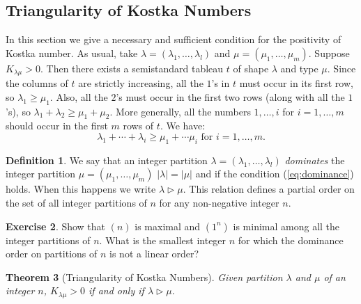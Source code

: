 \documentclass[11pt]{amsart}
\newtheorem{theorem}{Theorem}[subsection]
\theoremstyle{definition}
\newtheorem{definition}[theorem]{Definition}
\theoremstyle{example}
\newtheorem{exercise}[theorem]{Exercise}
\begin{document}
\subsection{Triangularity of Kostka Numbers}
\label{sec:triang-kostka-numb}
In this section we give a necessary and sufficient condition for the positivity of Kostka number.
As usual, take $\lambda=(\lambda_1,\dotsc,\lambda_l)$ and $\mu=(\mu_1,\dotsc,\mu_m)$.
Suppose $K_{\lambda\mu}>0$.
Then there exists a semistandard tableau $t$ of shape $\lambda$ and type $\mu$.
Since the columns of $t$ are strictly increasing, all the $1$'s in $t$ must occur in its first row, so $\lambda_1\geq \mu_1$.
Also, all the $2$'s must occur in the first two rows (along with all the $1$'s), so $\lambda_1+\lambda_2\geq \mu_1+\mu_2$.
More generally, all the numbers $1,\dotsc, i$ for $i=1,\dotsc,m$ should occur in the first $m$ rows of $t$.
We have:
\begin{equation}
  \label{eq:dominance}
  \lambda_1+\dotsb + \lambda_i \geq \mu_1+\dotsb \mu_i \text{ for } i=1,\dotsc, m.
\end{equation}
\begin{definition}
  We say that an integer partition $\lambda=(\lambda_1,\dotsc,\lambda_l)$ \emph{dominates} the integer partition $\mu=(\mu_1,\dotsc,\mu_m)$ $|\lambda|=|\mu|$ and if the condition (\ref{eq:dominance}) holds.
  When this happens we write $\lambda\rhd \mu$.
  This relation defines a partial order on the set of all integer partitions of $n$ for any non-negative integer $n$.
\end{definition}
\begin{exercise}
  Show that $(n)$ is maximal and $(1^n)$ is minimal among all the integer partitions of $n$.
  What is the smallest integer $n$ for which the dominance order on partitions of $n$ is not a linear order?
\end{exercise}
\begin{theorem}
  [Triangularity of Kostka Numbers]
  \label{theorem:Kostka-triangularity}
  Given partition $\lambda$ and $\mu$ of an integer $n$, $K_{\lambda\mu}>0$ if and only if $\lambda\rhd\mu$.
\end{theorem}
\end{document}
